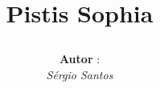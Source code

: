 \begin{titlepage}
	\title{
		\emptyline
		\begin{center}
		 	Pistis Sophia
		\end{center}		
	}
	\author{
		\begin{minipage}{1\linewidth}
			\begin{minipage}{0.4\linewidth}
				\flushleft
				\textbf{Autor} : \\
				\emph{S\'{e}rgio Santos} \\ %
			\end{minipage}
			\hspace{0.1\linewidth}
		\end{minipage}
		\minipagespace{2cm}
	}
	\date{}
\end{titlepage}
